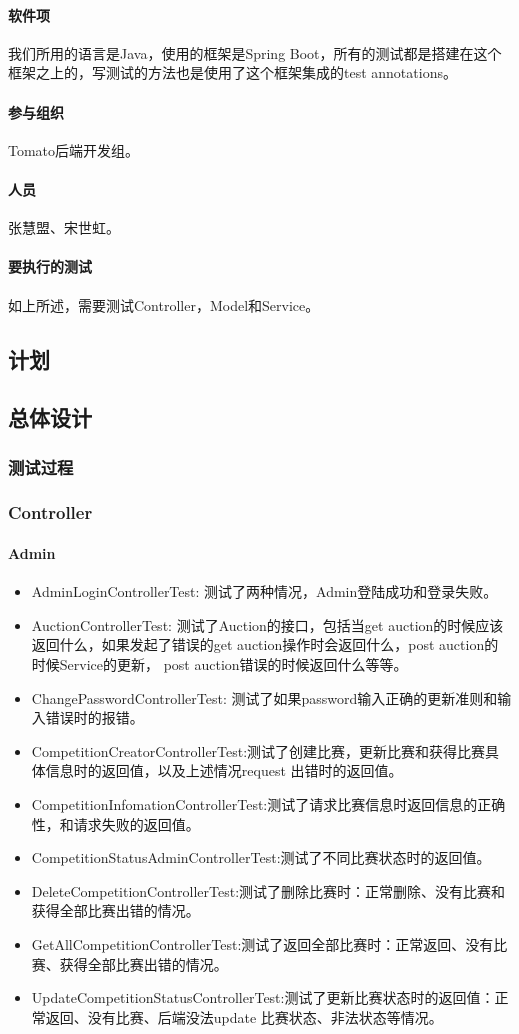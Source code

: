 \documentclass{article}
\begin{document}
\paragraph{软件项}
	我们所用的语言是Java，使用的框架是Spring Boot，所有的测试都是搭建在这个框架之上的，写测试的方法也是使用了这个框架集成的test annotations。
\paragraph{参与组织}
	Tomato后端开发组。
\paragraph{人员}
	张慧盟、宋世虹。
\paragraph{要执行的测试}
	如上所述，需要测试Controller，Model和Service。
\subsection{计划}
\subsection{总体设计}
\subsubsection{测试过程}
	\subsubsection{Controller}
		\paragraph{Admin}
			\begin{itemize}
			\item AdminLoginControllerTest: 测试了两种情况，Admin登陆成功和登录失败。
			\item AuctionControllerTest: 测试了Auction的接口，包括当get auction的时候应该返回什么，如果发起了错误的get auction操作时会返回什么，post auction的时候Service的更新， post auction错误的时候返回什么等等。
			\item ChangePasswordControllerTest: 测试了如果password输入正确的更新准则和输入错误时的报错。
			\item CompetitionCreatorControllerTest:测试了创建比赛，更新比赛和获得比赛具体信息时的返回值，以及上述情况request 出错时的返回值。
			\item CompetitionInfomationControllerTest:测试了请求比赛信息时返回信息的正确性，和请求失败的返回值。
			\item CompetitionStatusAdminControllerTest:测试了不同比赛状态时的返回值。
			\item DeleteCompetitionControllerTest:测试了删除比赛时：正常删除、没有比赛和获得全部比赛出错的情况。
			\item GetAllCompetitionControllerTest:测试了返回全部比赛时：正常返回、没有比赛、获得全部比赛出错的情况。
			\item UpdateCompetitionStatusControllerTest:测试了更新比赛状态时的返回值：正常返回、没有比赛、后端没法update 比赛状态、非法状态等情况。
			\end{itemize}
\end{document}
